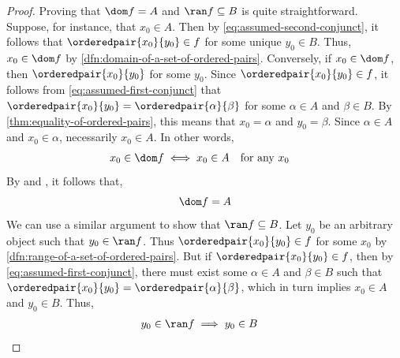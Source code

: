 \begin{proof}
    \vspace{0.3cm}
    \noindent
    Proving that \( \dom f = A \) and \( \ran f \subseteq B \)
    is quite straightforward. Suppose, for instance, that \( x_{0} \in A \).
    Then by \eqref{eq:assumed-second-conjunct}, it follows that
    \( \orderedpair{x_{0}}{y_{0}} \in f \) for some unique \( y_{0} \in B \).
    Thus, \( x_{0} \in \dom f \) by \cref{dfn:domain-of-a-set-of-ordered-pairs}.
    Conversely, if \( x_{0} \in \dom f \), then \( \orderedpair{x_{0}}{y_{0}} \)
    for some \( y_{0} \). Since \( \orderedpair{x_{0}}{y_{0}} \in f \), it follows
    from \eqref{eq:assumed-first-conjunct} that
    \( \orderedpair{x_{0}}{y_{0}} = \orderedpair{\alpha}{\beta} \) for some
    \( \alpha \in A \) and \( \beta \in B \). By \cref{thm:equality-of-ordered-pairs},
    this means that \( x_{0} = \alpha \) and \( y_{0} = \beta \). Since \( \alpha \in A \)
    and \( x_{0} \in \alpha \), necessarily \( x_{0} \in A \). In other words,
    \begin{equation*}
        \begin{aligned}
            x_{0} \in \dom f \iff x_{0} \in A&
        \end{aligned}
        \begin{aligned}
            &\text{for any \( x_{0} \)}
        \end{aligned}
    \end{equation*}
    By  and , it follows that,
    \begin{equation*}
        \dom f = A
    \end{equation*}
    We can use a similar argument to show that \( \ran f \subseteq B \). Let \( y_{0} \)
    be an arbitrary object such that \( y_{0} \in \ran f \). Thus \( \orderedpair{x_{0}}{y_{0}} \in f \)
    for some \( x_{0} \) by \cref{dfn:range-of-a-set-of-ordered-pairs}. But if \( \orderedpair{x_{0}}{y_{0}} \in f \),
    then by \eqref{eq:assumed-first-conjunct}, there must exist some \( \alpha \in A \) and \( \beta \in B \) such
    that \( \orderedpair{x_{0}}{y_{0}} = \orderedpair{\alpha}{\beta} \), which in turn implies \( x_{0} \in A \)
    and \( y_{0} \in B \). Thus,
    \begin{equation*}
        \begin{aligned}
            y_{0} \in \ran f \implies y_{0} \in B&
        \end{aligned}
        \begin{aligned}

\end{aligned}
\end{equation*}
\end{proof}
